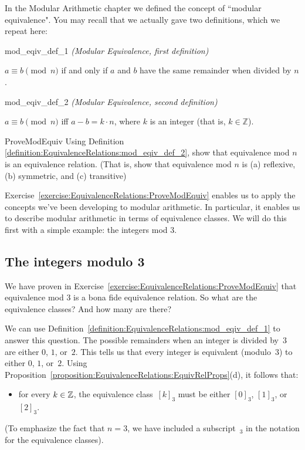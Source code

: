 In the Modular Arithmetic chapter we defined the concept of ``modular equivalence".  You may recall that we actually gave two definitions, which we repeat here: 

\begin{defn}{mod_eqiv_def_1} \emph{(Modular Equivalence, first definition)}

\medskip
$a \equiv b \pmod{n}$ if and only if $a$ and $b$ have the same remainder when divided by $n$.
\end{defn}



\begin{defn}{mod_eqiv_def_2} \emph{(Modular Equivalence, second definition)}

\medskip
$a \equiv b \pmod{n}$ iff $a - b = k \cdot n$, where $k$ is an integer (that is, $k \in  {\mathbb Z}$). 
\end{defn}

\begin{exercise}{ProveModEquiv}
Using  Definition  \ref{definition:EquivalenceRelations:mod_eqiv_def_2}, show that equivalence mod $n$ is an equivalence relation. (That is, show that equivalence mod $n$ is (a) reflexive, (b) symmetric, and (c) transitive)
\end{exercise}

Exercise~\ref{exercise:EquivalenceRelations:ProveModEquiv} enables us to apply the concepts we've been developing to modular arithmetic. In particular, it enables us to describe modular arithmetic in terms of equivalence classes. We will do this first with a simple example: the integers mod 3.

\subsection{The integers modulo 3}
\label{subsec:EquivalenceRelations:ModularArithmetic:IntegerMod3}

We have proven in Exercise~\ref{exercise:EquivalenceRelations:ProveModEquiv} that equivalence mod 3 is a bona fide equivalence relation. So what are the equivalence classes? And how many are there?
\medskip

We can use Definition~\ref{definition:EquivalenceRelations:mod_eqiv_def_1} to answer this question. The possible remainders when an integer is divided by~$3$ are either $0$, $1$, or~$2$. This tells us that  every integer is equivalent (modulo~$3$) to either $0$, $1$, or~$2$. Using Proposition~\ref{proposition:EquivalenceRelations:EquivRelProps}(d), it follows that:
\begin{itemize}
\item[] for every $k \in \mathbb{Z}$, the equivalence class~$[k]_3$ must be either $[0]_3$, $[1]_3$, or~$[2]_3$.
\end{itemize}
(To emphasize the fact that $n = 3$, we have included a subscript~${}_3$ in the notation for the equivalence classes).

